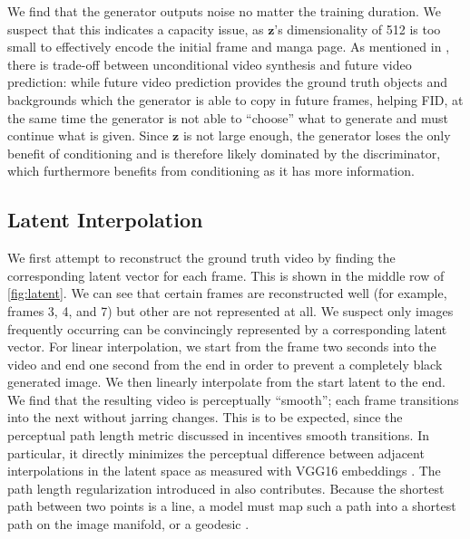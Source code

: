 \documentclass[11pt, oneside]{article}
\begin{document}
We find that the generator outputs noise no matter the training duration. We
suspect that this indicates a capacity issue, as \( \bm{z} \)'s dimensionality
of 512 is too small to effectively encode the initial frame and manga page.
As mentioned in \cite{dvdgan}, there is trade-off between unconditional video
synthesis and future video prediction: while future video prediction provides
the ground truth objects and backgrounds which the generator is able to copy
in future frames, helping FID, at the same time the generator is not able
to \enquote{choose} what to generate and must continue what is given. Since
\( \bm{z} \) is not large enough, the generator loses the only benefit of
conditioning and is therefore likely dominated by the discriminator, which
furthermore benefits from conditioning as it has more information.

\subsection{Latent Interpolation}

We first attempt to reconstruct the ground truth video by finding the
corresponding latent vector for each frame. This is shown in the middle row
of \autoref{fig:latent}. We can see that certain frames are reconstructed
well (for example, frames 3, 4, and 7) but other are not represented at all.
We suspect only images frequently occurring can be convincingly represented
by a corresponding latent vector. For linear interpolation, we start from
the frame two seconds into the video and end one second from the end in
order to prevent a completely black generated image. We then linearly
interpolate from the start latent to the end. We find that the resulting
video is perceptually \enquote{smooth}; each frame transitions into the next
without jarring changes. This is to be expected, since the perceptual path
length metric discussed in \cite{stylegan, stylegan2} incentives smooth
transitions. In particular, it directly minimizes the perceptual difference
between adjacent interpolations in the latent space as measured with VGG16
embeddings \cite{stylegan, vgg}. The path length regularization introduced
in \cite{stylegan2} also contributes. Because the shortest path between two
points is a line, a model must map such a path into a shortest path on the
image manifold, or a geodesic \cites{stylegan2}.
\end{document}

